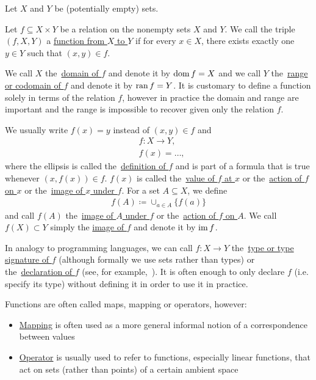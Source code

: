 \begin{definition}[Functions]\label{def:functions}
  Let $X$ and $Y$ be (potentially empty) sets.

  Let $f \subseteq X \times Y$ be a relation on the nonempty sets $X$ and $Y$. We call the triple $(f, X, Y)$ a \uline{function from $X$ to $Y$} if for every $x \in X$, there exists exactly one $y \in Y$ such that $(x, y) \in f$.

  We call $X$ the~\uline{domain of $f$} and denote it by $\operatorname{dom} f = X$ and we call $Y$ the~\uline{range or codomain of $f$} and denote it by $\operatorname{ran} f = Y$. It is customary to define a function solely in terms of the relation $f$, however in practice the domain and range are important and the range is impossible to recover given only the relation $f$.

  We usually write $f(x) = y$ instead of $(x, y) \in f$ and
  \begin{align*}
    &f: X \to Y, \\
    &f(x) = \ldots,
  \end{align*}
  where the ellipsis is called the~\uline{definition of $f$} and is part of a formula that is true whenever $(x, f(x)) \in f$. $f(x)$ is called the~\uline{value of $f$ at $x$} or the~\uline{action of $f$ on $x$} or the~\uline{image of $x$ under $f$}. For a set $A \subseteq X$, we define
  \begin{align*}
    f(A) \coloneqq \cup_{a \in A} \{ f(a) \}
  \end{align*}
  and call $f(A)$ the~\uline{image of $A$ under $f$} or the~\uline{action of $f$ on $A$}. We call $f(X) \subset Y$ simply the \uline{image of $f$} and denote it by $\operatorname{im} f$.

  In analogy to programming languages, we can call $f: X \to Y$ the~\uline{type or type signature of $f$} (although formally we use sets rather than types) or the~\uline{declaration of $f$} (see, for example,~\cite[section 2.4]{Kernighan1988}). It is often enough to only declare $f$ (i.e. specify its type) without defining it in order to use it in practice.

  Functions are often called maps, mapping or operators, however:
  \begin{itemize}
    \item \uline{Mapping} is often used as a more general informal notion of a correspondence between values
    \item \uline{Operator} is usually used to refer to functions, especially linear functions, that act on sets (rather than points) of a certain ambient space
  \end{itemize}


\end{definition}
